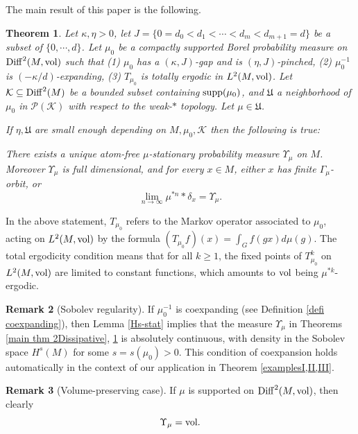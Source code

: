 \documentclass[11pt, leqno, fleqn]{amsart}
\def\cU{\mathfrak U}
\newcommand{\cP}{{\mathcal P}}
\newcommand{\cK}{{\mathcal K}}
\newtheorem{thm}{\bf Theorem}[section]
\theoremstyle{definition}
\newtheorem{rema}[thm]{\bf Remark}
\theoremstyle{definition}
\def\supp{{\rm supp}}
\def \vol{  {\rm vol} }
\newcommand{\Diff}{{\rm Diff}}
\begin{document}
 
\bigskip

The main result of this paper is the following.





\begin{thm} \label{thm mainDissipative}
 	Let  $\kappa, \eta > 0$,  let $J = \{  0 = d_0 < d_1 <   \cdots < d_m < d_{m+1} = d \}$ be a subset of $ \{0, \cdots, d \}$. 
	Let $\mu_0$ be a compactly supported Borel probability measure on $\Diff^{2}(M, \vol)$ such that 
	(1) $\mu_0$  has  a $(\kappa, J)$-gap and is $(\eta, J)$-pinched, 
	(2)   $\mu_{0}^{-1}$ is $(-\kappa/d)$-expanding,   
	(3) $T_{\mu_0}$ is totally ergodic in $L^2(M, \vol)$.
	Let $\cK  \subseteq \Diff^{2}(M)$ be a bounded subset containing $\supp(\mu_0)$, and 
	$\cU$ a  neighborhood  of $\mu_0$ in $\cP(\cK)$ with respect to the weak-$*$ topology.  Let $\mu\in \cU$.

	
	If  $\eta, \cU$ are small enough depending on $M,\mu_{0}, \cK$ then the following is true:
	
		There exists a unique atom-free $\mu$-stationary probability measure $ \Upsilon_{\mu}$ on $M$. Moreover $\Upsilon_{\mu}$ is full dimensional, and  for every  $x \in M$, either $x$ has finite $\Gamma_{\mu}$-orbit, or  
	$$\lim_{n \to \infty} \mu^{*n} * \delta_{x} = \Upsilon_{\mu}.$$   

\end{thm}
 
 
 In the above statement,  $T_{\mu_0}$ refers to the Markov operator associated to $\mu_{0}$, acting on $L^2(M, \vol)$ by the formula $(T_{\mu_{0}}f)(x)=\int_{G}f(gx)d\mu(g)$. The total ergodicity condition means that for all $k\geq 1$, the fixed points of $T^k_{\mu_{0}}$  on $L^2(M, \vol)$ are limited to  constant functions, which amounts to  $\vol$ being $\mu^{*k}$-ergodic. 


\begin{rema}[Sobolev regularity]
If $\mu_{0}^{-1}$ is coexpanding (see Definition \ref{defi coexpanding}), then Lemma \ref{Hs-stat} implies that the measure $\Upsilon_{\mu}$ in Theorems \ref{main thm 2Dissipative}, \ref{thm mainDissipative} is  absolutely continuous, with density in the Sobolev space $H^s(M)$ for some $s=s(\mu_{0})>0$. This condition of coexpansion  holds automatically in the context of our application in Theorem \ref{examplesI,II,III}.
\end{rema}


\begin{rema}[Volume-preserving case]
If $\mu$ is supported on $\Diff^2(M, \vol)$, then clearly $$\Upsilon_{\mu}=\vol.$$ 
\end{rema}
\end{document}
